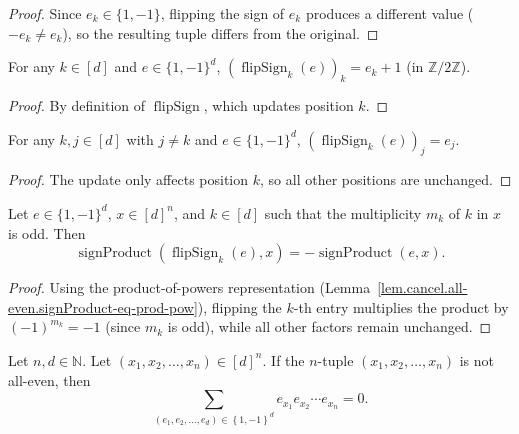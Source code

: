 \begin{proof}
\leanok
Since $e_k \in \{1, -1\}$, flipping the sign of $e_k$ produces a different
value ($-e_k \neq e_k$), so the resulting tuple differs from the original.
\end{proof}

\begin{lemma}
\label{lem.cancel.flipSign-self}
\leanhelper
\leanok
For any $k \in [d]$ and $e \in \{1,-1\}^d$,
$(\operatorname{flipSign}_k(e))_k = e_k + 1$ (in $\mathbb{Z}/2\mathbb{Z}$).
\end{lemma}

\begin{proof}
\leanok
By definition of $\operatorname{flipSign}$, which updates position $k$.
\end{proof}

\begin{lemma}
\label{lem.cancel.flipSign-ne-self}
\leanhelper
\leanok
For any $k, j \in [d]$ with $j \neq k$ and $e \in \{1,-1\}^d$,
$(\operatorname{flipSign}_k(e))_j = e_j$.
\end{lemma}

\begin{proof}
\leanok
The update only affects position $k$, so all other positions are unchanged.
\end{proof}

\begin{lemma}
\label{lem.cancel.signProduct-flipSign}
\leanhelper
\leanok
Let $e \in \{1,-1\}^d$, $x \in [d]^n$, and $k \in [d]$ such that the
multiplicity $m_k$ of $k$ in $x$ is odd. Then
\[
\operatorname{signProduct}(\operatorname{flipSign}_k(e), x) =
-\operatorname{signProduct}(e, x).
\]
\end{lemma}

\begin{proof}
\leanok
Using the product-of-powers representation (Lemma~\ref{lem.cancel.all-even.signProduct-eq-prod-pow}),
flipping the $k$-th entry multiplies the product by $(-1)^{m_k} = -1$
(since $m_k$ is odd), while all other factors remain unchanged.
\end{proof}

\begin{lemma}
\label{lem.cancel.all-even.l2a}
\leanhelper
\leanok
Let $n,d\in\mathbb{N}$. Let $\left(  x_{1}%
,x_{2},\ldots,x_{n}\right)  \in\left[  d\right]  ^{n}$.
If the $n$-tuple $\left(  x_{1},x_{2},\ldots,x_{n}\right)  $ is
not all-even, then
\[
\sum_{\left(  e_{1},e_{2},\ldots,e_{d}\right)  \in\left\{  1,-1\right\}  ^{d}%
}e_{x_{1}}e_{x_{2}}\cdots e_{x_{n}}=0.
\]
\end{lemma}


